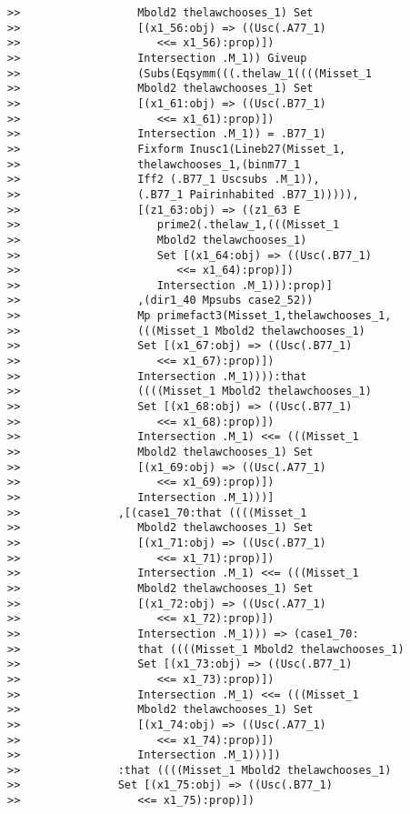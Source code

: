 \documentclass[12pt]{article}
\begin{document}
\begin{verbatim}
>>                  Mbold2 thelawchooses_1) Set
>>                  [(x1_56:obj) => ((Usc(.A77_1)
>>                     <<= x1_56):prop)])
>>                  Intersection .M_1)) Giveup
>>                  (Subs(Eqsymm(((.thelaw_1((((Misset_1
>>                  Mbold2 thelawchooses_1) Set
>>                  [(x1_61:obj) => ((Usc(.B77_1)
>>                     <<= x1_61):prop)])
>>                  Intersection .M_1)) = .B77_1)
>>                  Fixform Inusc1(Lineb27(Misset_1,
>>                  thelawchooses_1,(binm77_1
>>                  Iff2 (.B77_1 Uscsubs .M_1)),
>>                  (.B77_1 Pairinhabited .B77_1))))),
>>                  [(z1_63:obj) => ((z1_63 E
>>                     prime2(.thelaw_1,(((Misset_1
>>                     Mbold2 thelawchooses_1)
>>                     Set [(x1_64:obj) => ((Usc(.B77_1)
>>                        <<= x1_64):prop)])
>>                     Intersection .M_1))):prop)]
>>                  ,(dir1_40 Mpsubs case2_52))
>>                  Mp primefact3(Misset_1,thelawchooses_1,
>>                  (((Misset_1 Mbold2 thelawchooses_1)
>>                  Set [(x1_67:obj) => ((Usc(.B77_1)
>>                     <<= x1_67):prop)])
>>                  Intersection .M_1)))):that
>>                  ((((Misset_1 Mbold2 thelawchooses_1)
>>                  Set [(x1_68:obj) => ((Usc(.B77_1)
>>                     <<= x1_68):prop)])
>>                  Intersection .M_1) <<= (((Misset_1
>>                  Mbold2 thelawchooses_1) Set
>>                  [(x1_69:obj) => ((Usc(.A77_1)
>>                     <<= x1_69):prop)])
>>                  Intersection .M_1)))]
>>               ,[(case1_70:that ((((Misset_1
>>                  Mbold2 thelawchooses_1) Set
>>                  [(x1_71:obj) => ((Usc(.B77_1)
>>                     <<= x1_71):prop)])
>>                  Intersection .M_1) <<= (((Misset_1
>>                  Mbold2 thelawchooses_1) Set
>>                  [(x1_72:obj) => ((Usc(.A77_1)
>>                     <<= x1_72):prop)])
>>                  Intersection .M_1))) => (case1_70:
>>                  that ((((Misset_1 Mbold2 thelawchooses_1)
>>                  Set [(x1_73:obj) => ((Usc(.B77_1)
>>                     <<= x1_73):prop)])
>>                  Intersection .M_1) <<= (((Misset_1
>>                  Mbold2 thelawchooses_1) Set
>>                  [(x1_74:obj) => ((Usc(.A77_1)
>>                     <<= x1_74):prop)])
>>                  Intersection .M_1)))])
>>               :that ((((Misset_1 Mbold2 thelawchooses_1)
>>               Set [(x1_75:obj) => ((Usc(.B77_1)
>>                  <<= x1_75):prop)])

\end{verbatim}
\end{document}
